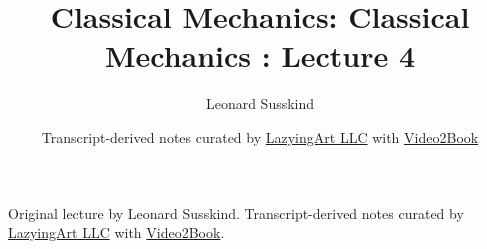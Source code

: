 \documentclass[11pt,oneside]{book}
\begin{document}
\frontmatter
\title{Classical Mechanics: Classical Mechanics : Lecture 4}
\author{Leonard Susskind}
\date{Transcript-derived notes curated by \href{https://lazying.art}{LazyingArt LLC} with \href{https://github.com/lachlanchen/Video2Book}{Video2Book}}
\maketitle
\begin{center}
\small Original lecture by Leonard Susskind. Transcript-derived notes curated by \href{https://lazying.art}{LazyingArt LLC} with \href{https://github.com/lachlanchen/Video2Book}{Video2Book}.
\end{center}
\clearpage
\mainmatter

\end{document}

